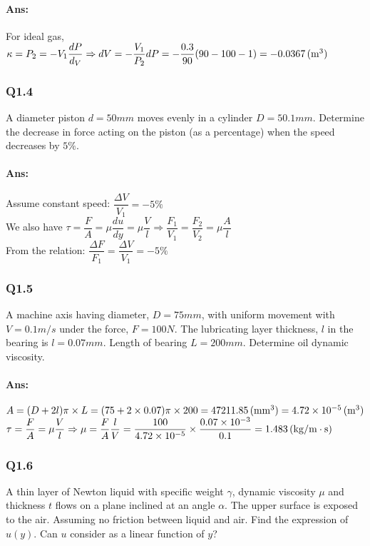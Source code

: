\paragraph{Ans:}$ $\\
For ideal gas, $ \kappa = P_2 = -V_1\dfrac{dP}{d_V} \\
\Rightarrow dV = -\dfrac{V_1}{P_2}dP=-\dfrac{0.3}{90}(90-100-1)=-0.0367\, (\mathrm{m^3})$
\subsubsection{Q1.4}
A diameter piston $ d=50 \unit{mm} $ moves evenly in a  cylinder $ D=50.1 \unit{mm} $. Determine the decrease in force acting on the piston (as a percentage) when the speed decreases by $ 5\% $.
\paragraph{Ans:}$ $\\
Assume constant speed: $ \dfrac{\Delta V}{V_1} = -5\%$\\
We also have $ \tau = \dfrac{F}{A} = \mu \dfrac{du}{dy} = \mu\dfrac{V}{l}\Rightarrow \dfrac{F_1}{V_1} = \dfrac{F_2}{V_2} = \mu \dfrac{A}{l}$\\
From the relation: $ \dfrac{\Delta F}{F_1} = \dfrac{\Delta V}{V_1}=-5\%$
\subsubsection{Q1.5}
A machine axis having diameter, $ D = 75 \unit{mm} $, with uniform movement with $  V = 0.1 \unit{m/s} $ under the force, $ F = 100\unit{N} $. The lubricating layer thickness, $ l $ in the bearing is $ l=0.07 \unit{mm} $. Length of bearing $ L = 200 \unit{mm} $. Determine oil dynamic viscosity.
\paragraph{Ans:}$ $\\
$ A = (D+2l)\pi\times L = (75+2\times0.07)\pi\times200=47211.85\, (\mathrm{mm^3}) =4.72\times10^{-5}\, (\mathrm{m^3})$\\
$ \tau=\dfrac{F}{A}=\mu\dfrac{V}{l}\Rightarrow\mu=\dfrac{F}{A}\dfrac{l}{V}=\dfrac{100}{4.72\times10^{-5}}\times \dfrac{0.07\times10^{-3}}{0.1}=1.483\, (\mathrm{kg/m\cdot s})$
\subsubsection{Q1.6}
A thin layer of Newton liquid with specific weight $ \gamma $, dynamic viscosity $ \mu $ and thickness $ t $ flows on a plane inclined at an angle $ \alpha $. The upper surface is exposed to the air. Assuming no friction
between liquid and air. Find the expression of  $ u(y) $. Can $ u $ consider as a linear
function of $ y $?
